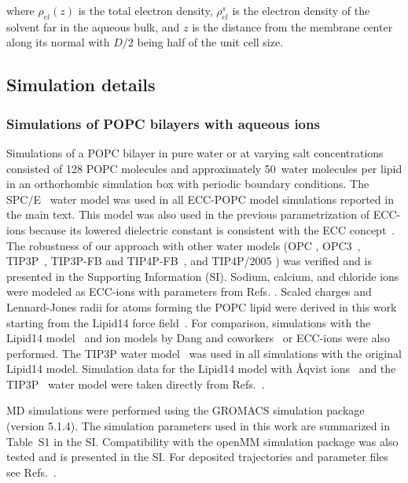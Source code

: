 \documentclass[journal=jpcbfk,manuscript=article]{achemso}
\begin{document}
\noindent where $\rho_{el} (z)$ is the total electron density, $\rho_{el}^s$ is the electron density of the solvent far in the aqueous bulk, and $z$ is the distance from the membrane center along its normal with $D/2$ being half of the unit cell size.  




\subsection{Simulation details}

\subsubsection{Simulations of POPC bilayers with aqueous ions}
Simulations of a POPC bilayer in pure water or at varying salt concentrations consisted of 128 POPC molecules
and approximately 50~water molecules per lipid in an orthorhombic simulation box with periodic boundary conditions.
The SPC/E~\cite{Berendsen1987} water model was used in all ECC-POPC model simulations reported
in the main text. This model was also used in the previous parametrization
of ECC-ions \cite{martinek17, kohagen16, Pluharova2014} because its lowered dielectric constant is consistent with
the ECC concept~\cite{leontyev11, leontyev14}.
The robustness of our approach with other water models (OPC \cite{Izadi14},
OPC3~\cite{Izadi16}, TIP3P~\cite{jorgensen83}, TIP3P-FB and TIP4P-FB~\cite{Wang2014}, and TIP4P/2005 \cite{Abascal2005})
was verified and is presented in the Supporting Information (SI).
Sodium, calcium, and chloride ions were modeled as ECC-ions
with parameters from Refs. . Scaled charges and Lennard-Jones radii for atoms
forming the POPC lipid were derived in this work starting from the Lipid14 force field~\cite{dickson14}.
For comparison, simulations with the Lipid14 model~\cite{dickson14} and
ion models by Dang and coworkers~\cite{smith94,chang1999,dang2006} or ECC-ions \cite{martinek17, kohagen16, Pluharova2014}
were also performed. The TIP3P water model~\cite{jorgensen83} was used in all simulations with the original Lipid14 model.
Simulation data for the Lipid14 model with \AA{}qvist ions~\cite{aqvist90} and the TIP3P~\cite{jorgensen83} water model were taken directly from
Refs.~.  

MD simulations were performed using the GROMACS \cite{Abraham15} simulation package (version 5.1.4). The simulation parameters used
in this work are summarized in Table~S1 in the SI. 
Compatibility with the openMM simulation package \cite{openmm7} was also
tested and is presented in the SI. 
For deposited trajectories and parameter files see 
Refs.~.
\end{document}
